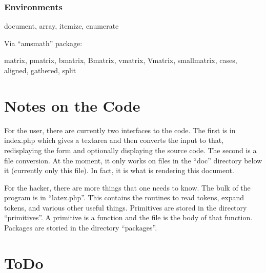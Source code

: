 \documentclass{webpage}
\begin{document}
{\subsubsection{Environments}

document, array, itemize, enumerate

Via ``amsmath'' package:

matrix, pmatrix, bmatrix, Bmatrix, vmatrix, Vmatrix, smallmatrix, cases, aligned, gathered, split


\section{Notes on the Code}

For the user, there are currently two interfaces to the code.
The first is in index.php which gives a textarea and then converts the input to that, redisplaying the form and optionally displaying the source code.
The second is a file conversion.
At the moment, it only works on files in the ``doc'' directory below it (currently only this file).
In fact, it is what is rendering this document.

For the hacker, there are more things that one needs to know.
The bulk of the program is in ``latex.php''.
This contains the routines to read tokens, expand tokens, and various other useful things.
Primitives are stored in the directory ``primitives''.
A primitive is a function and the file is the body of that function.
Packages are storied in the directory ``packages''.

\section{ToDo}


}
\end{document}
